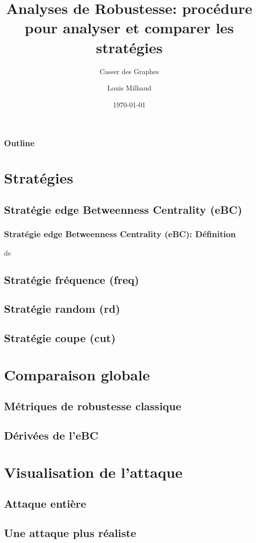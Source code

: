 \documentclass[aspectratio=169]{beamer}
\title{Analyses de Robustesse: procédure pour analyser et comparer les stratégies}
\subtitle{Casser des Graphes}
\author{Louis Milhaud}
\institute{Complex Networks - LIP6}
\date{\today}
\begin{document}
    \begin{frame}
        \titlepage
    \end{frame}

    \begin{frame}
        \frametitle{Outline}
        \tableofcontents
    \end{frame}

    \section{Stratégies}
    \subsection{Stratégie edge Betweenness Centrality (eBC)}
    \begin{frame}
        \frametitle{Stratégie edge Betweenness Centrality (eBC): Définition}
        \begin{algorithmic}
            de
        \end{algorithmic}
    \end{frame}
    \subsection{Stratégie fréquence (freq)}
    \subsection{Stratégie random (rd)}
    \subsection{Stratégie coupe (cut)}
    \section{Comparaison globale}
    \subsection{Métriques de robustesse classique}
    \subsection{Dérivées de l'eBC}
    \section{Visualisation de l'attaque}
    \subsection{Attaque entière}
    \subsection{Une attaque plus réaliste}
    
\end{document}
